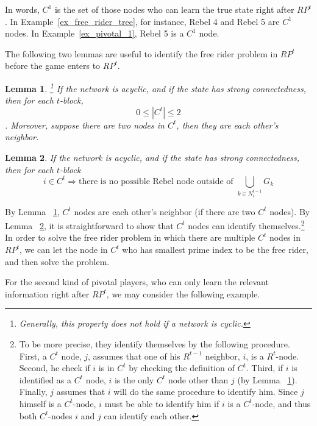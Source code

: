\documentclass[12pt,letter]{article}
\newtheorem{lemma}{Lemma}[section]
\theoremstyle{definition}
\theoremstyle{remark}
\theoremstyle{claim}
\begin{document}
In words, $C^1$ is the set of those nodes who can learn the true state right after $RP^t$. In Example~\ref{ex_free_rider_tree}, for instance, Rebel 4 and Rebel 5 are $C^1$ nodes. In Example~\ref{ex_pivotal_1}, Rebel 5  is a $C^1$ node. 

The following two lemmas are useful to identify the free rider problem in $RP^t$ before the game enters to $RP^t$. 

\begin{lemma}
\label{lemma_at_most_two_nodes}\footnote{Generally, this property does not hold if a network is cyclic.}
If the network is acyclic, and if the state has strong connectedness, then for each $t$-block, \[0\leq |C^t| \leq 2\]. Moreover, suppose there are two nodes in $C^t$, then they are each other's neighbor.
\end{lemma}
\begin{lemma}
\label{lemma_no_node_outside}
If the network is acyclic, and if the state has strong connectedness, then for each $t$-block
\[i\in C^t \Rightarrow \text{there is no possible Rebel node outside of }\bigcup_{k\in N^{t-1}_i}G_k\]
\end{lemma}

By Lemma ~\ref{lemma_at_most_two_nodes}, $C^t$ nodes are each other's neighbor (if there are two $C^t$ nodes). By Lemma ~\ref{lemma_no_node_outside}, it is straightforward to show that $C^t$ nodes can identify themselves.\footnote{To be more precise, they identify themselves by the following procedure. First, a $C^t$ node, $j$, assumes that one of his $R^{t-1}$ neighbor, $i$, is a $R^t$-node. Second, he check if $i$ is in $C^t$ by checking the definition of $C^t$. Third, if $i$ is identified as a $C^t$ node, $i$ is the only $C^t$ node other than $j$ (by Lemma ~\ref{lemma_at_most_two_nodes}). Finally, $j$ assumes that $i$ will do the same procedure to identify him. Since $j$ himself is a $C^t$-node, $i$ must be able to identify him if $i$ is a $C^t$-node, and thus both $C^t$-nodes $i$ and $j$ can identify each other.} In order to solve the free rider problem in which there are multiple $C^t$ nodes in $RP^t$, we can let the node in $C^t$ who has smallest prime index to be the free rider, and then solve the problem.

For the second kind of pivotal players, who can only learn the relevant information right after $RP^t$, we may consider the following example.
\end{document}
